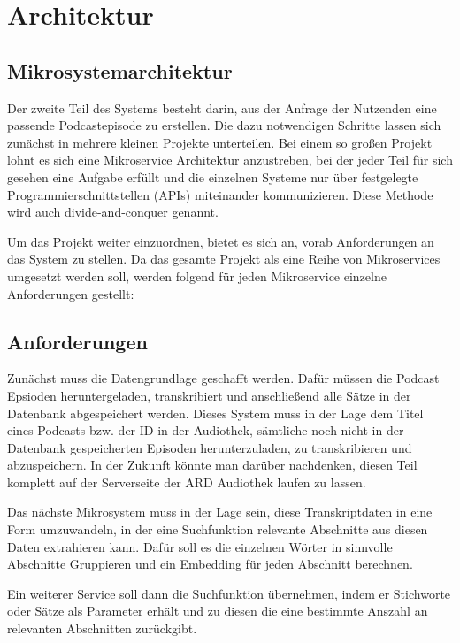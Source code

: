 \chapter{Architektur}\label{ch:method}

\section{Mikrosystemarchitektur}

Der zweite Teil des Systems besteht darin, aus der Anfrage der Nutzenden eine passende Podcastepisode zu erstellen.
Die dazu notwendigen Schritte lassen sich zunächst in mehrere kleinen Projekte unterteilen. 
Bei einem so großen Projekt lohnt es sich eine Mikroservice Architektur anzustreben, bei der jeder Teil für sich gesehen eine Aufgabe erfüllt und die einzelnen Systeme nur über festgelegte Programmierschnittstellen (APIs) miteinander kommunizieren.
Diese Methode wird auch divide-and-conquer genannt. 

Um das Projekt weiter einzuordnen, bietet es sich an, vorab Anforderungen an das System zu stellen. 
Da das gesamte Projekt als eine Reihe von Mikroservices umgesetzt werden soll, werden folgend für jeden Mikroservice einzelne Anforderungen gestellt: 

\section{Anforderungen}

Zunächst muss die Datengrundlage geschafft werden. 
Dafür müssen die Podcast Epsioden heruntergeladen, transkribiert und anschließend alle Sätze in der Datenbank abgespeichert werden.
Dieses System muss in der Lage dem Titel eines Podcasts bzw. der ID in der Audiothek, sämtliche noch nicht in der Datenbank gespeicherten Episoden herunterzuladen, zu transkribieren und abzuspeichern.
In der Zukunft könnte man darüber nachdenken, diesen Teil komplett auf der Serverseite der ARD Audiothek laufen zu lassen.

Das nächste Mikrosystem muss in der Lage sein, diese Transkriptdaten in eine Form umzuwandeln, in der eine Suchfunktion relevante Abschnitte aus diesen Daten extrahieren kann.
Dafür soll es die einzelnen Wörter in sinnvolle Abschnitte Gruppieren und ein Embedding für jeden Abschnitt berechnen.

Ein weiterer Service soll dann die Suchfunktion übernehmen, indem er Stichworte oder Sätze als Parameter erhält und zu diesen die eine bestimmte Anszahl an relevanten Abschnitten zurückgibt.

